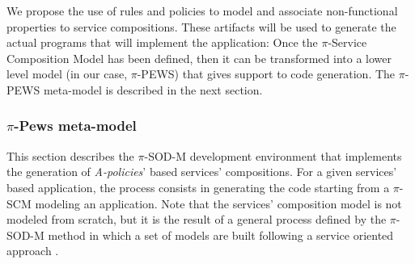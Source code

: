 We propose the use of rules and policies to model and associate non-functional properties to service compositions.
These artifacts will be used to generate the actual programs that will implement the application:
Once the $\pi$-Service Composition Model has been defined, then it can be transformed into a lower level model (in our case, $\pi$-PEWS) that gives support to code generation. 
The $\pi$-PEWS  meta-model is described in the next section. 


\subsubsection{$\pi$-{\sc Pews}  meta-model}\label{sec:pewsmetamodel}


This section  describes the $\pi$-SOD-M development environment that implements the generation of {\em A-policies}' based services' compositions. For a given services' based application, the process  consists in generating the  code starting from a $\pi$-SCM modeling an application. Note that the services' composition model is not modeled from scratch, but it is the result of a general process defined by the $\pi$-SOD-M method in which a set of models are built following a service oriented approach \cite{decastro1}.



